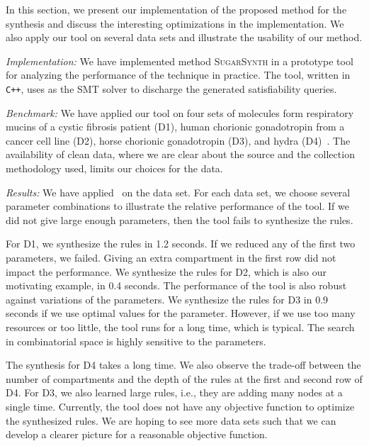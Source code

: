 In this section, we  present our implementation of the proposed method for the synthesis
and discuss the interesting optimizations in the implementation.
%
We also apply our tool on several data sets and illustrate the usability of our method.

{\em Implementation:} 
We have implemented method \textsc{SugarSynth} in a prototype tool {\ourtool} for
analyzing the performance of the technique in practice.
%
The tool, written in {\tt C++}, uses {\zthree}\cite{z3} as the SMT solver
to discharge the generated satisfiability queries.
%


{\em Benchmark: }
We have applied our tool on four sets of molecules form
respiratory mucins of a cystic fibrosis patient (D1),
human chorionic gonadotropin from a cancer cell line (D2), horse chorionic gonadotropin (D3), and
hydra (D4)~\cite{Jaiman2018,hydra}.
The availability of clean data, where we are clear about the source and the collection
methodology used, limits our choices for the data.



{\em Results:} We have applied \ourtool~on the data set. For each data set, we choose several
parameter combinations to illustrate the relative performance of the tool.
If we did not give large enough parameters, then the tool fails to synthesize the rules.

For D1, we synthesize the rules in 1.2 seconds. If we reduced any of the first
two parameters, we failed.
Giving an extra compartment in the first row did not impact the performance.
We synthesize the rules for D2, which is also our motivating example, in 0.4 seconds.
The performance of the tool is also robust against variations of the parameters.
We synthesize the rules for D3 in 0.9 seconds if we use optimal values for the parameter.
However, if we use too many resources or too little, the tool runs for a long time,
which is typical. The search in combinatorial space is highly sensitive to the parameters.

The synthesis for D4 takes a long time. We also observe the trade-off between the number of compartments
and the depth of the rules at the first and second row of D4.
For D3, we also learned large rules, i.e., they are adding many nodes at a single time.
Currently, the tool does not have any objective function to optimize the synthesized rules.
We are hoping to see more data sets such that we can develop a clearer picture
for a reasonable objective function.

